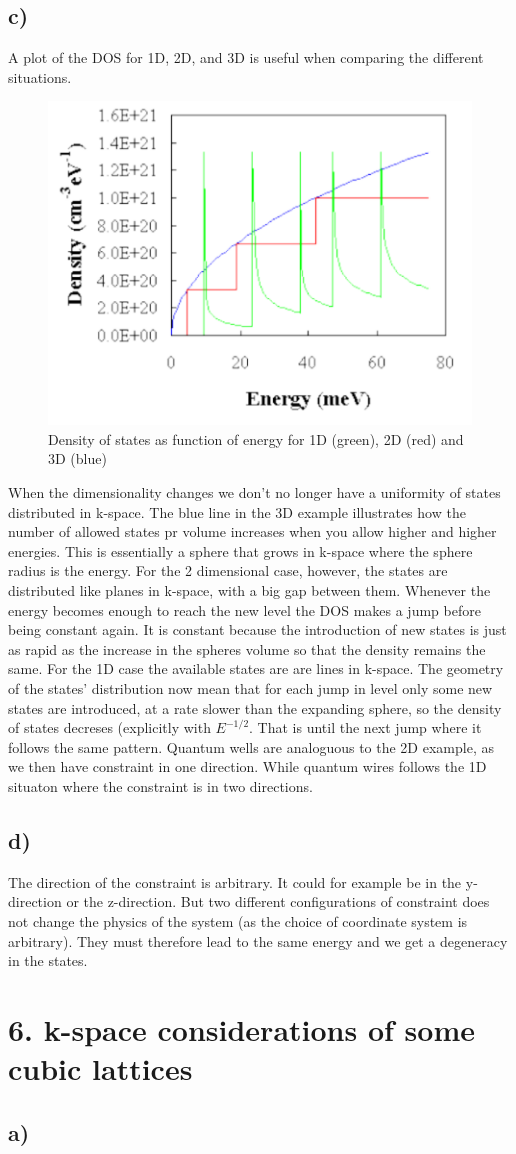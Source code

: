 \documentclass{article}
\begin{document}
\subsection*{c)}
A plot of the DOS for 1D, 2D, and 3D is useful when comparing the different situations.
\begin{figure}[H]
	\includegraphics[width = 0.7\linewidth]{dos.png}
	\centering
	\caption{Density of states as function of energy for 1D (green), 2D (red) and 3D (blue)}
\end{figure}

When the dimensionality changes we don't no longer have a uniformity of states distributed in k-space. The blue line in the 3D example illustrates how the number of allowed states pr volume increases when you allow higher and higher energies. This is essentially a sphere that grows in k-space where the sphere radius is the energy. For the 2 dimensional case, however, the states are distributed like planes in k-space, with a big gap between them. Whenever the energy becomes enough to reach the new level the DOS makes a jump before being constant again. It is constant because the introduction of new states is just as rapid as the increase in the spheres volume so that the density remains the same. For the 1D case the available states are are lines in k-space. The geometry of the states' distribution now mean that for each jump in level only some new states are introduced, at a rate slower than the expanding sphere, so the density of states decreses (explicitly with $E^{-1/2}$. That is until the next jump where it follows the same pattern. Quantum wells are analoguous to the 2D example, as we then have constraint in one direction. While quantum wires follows the 1D situaton where the constraint is in two directions.

\subsection*{d)}
The direction of the constraint is arbitrary. It could for example be in the y-direction or the z-direction. But two different configurations of constraint does not change the physics of the system (as the choice of coordinate system is arbitrary). They must therefore lead to the same energy and we get a degeneracy in the states. 

\newpage
\section*{ 6. k-space considerations of some cubic lattices }
\subsection{a)}
\end{document}
